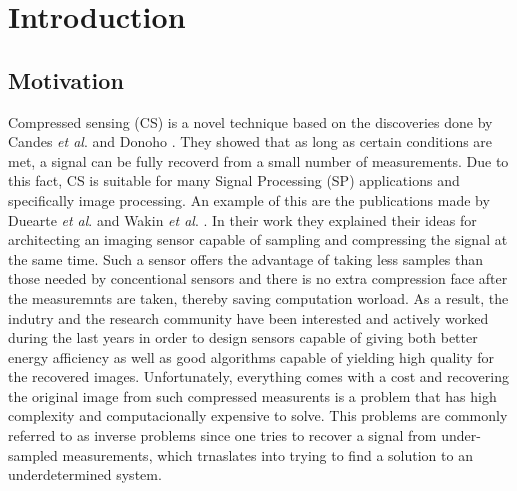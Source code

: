 \chapter{Introduction}
\section{Motivation}
Compressed sensing (CS) is a novel technique based on the discoveries done by Candes \textit{et al}. \cite{CandesR07} and Donoho \cite{Donoho01}. They showed that as long as certain conditions are met, a signal can be fully recoverd from a small number of measurements. Due to this fact, CS is suitable for many Signal Processing (SP) applications and specifically image processing. An example of this are the publications made by Duearte \textit{et al}. and Wakin \textit{et al}. \cite{duarte2008single,wakin2006architecture}. In their work they explained their ideas for architecting an imaging sensor capable of sampling and compressing the signal at the same time. Such a sensor offers the advantage of taking less samples than those needed by concentional sensors and there is no extra compression face after the measuremnts are taken, thereby saving computation worload. As a result, the indutry and the research community have been interested and actively worked during the last years in order to design sensors capable of giving both better energy afficiency as well as good algorithms capable of yielding high quality for the recovered images. Unfortunately, everything comes with a cost and recovering the original image from such compressed measurents is a problem that has high complexity and computacionally expensive to solve. This problems are commonly referred to as inverse problems since one tries to recover a signal from under-sampled measurements, which trnaslates into trying to find a solution to an underdetermined system. \

